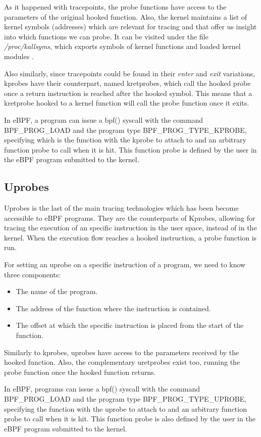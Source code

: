 As it happened with tracepoints, the probe functions have access to the parameters of the original hooked function. Also, the kernel maintains a list of kernel symbols (addresses) which are relevant for tracing and that offer us insight into which functions we can probe. It can be visited under the file \textit{/proc/kallsyms}, which exports symbols of kernel functions and loaded kernel modules \cite{kallsyms_kernel}.

Also similarly, since tracepoints could be found in their \textit{enter} and \textit{exit} variations, kprobes have their counterpart, named kretprobes, which call the hooked probe once a return instruction is reached after the hooked symbol. This means that a kretprobe hooked to a kernel function will call the probe function once it exits.

In eBPF, a program can issue a bpf() syscall with the command BPF\_PROG\_LOAD and the program type BPF\_PROG\_TYPE\_KPROBE, specifying which is the function with the kprobe to attach to and an arbitrary function probe to call when it is hit. This function probe is defined by the user in the eBPF program submitted to the kernel.

\subsection{Uprobes}
Uprobes is the last of the main tracing technologies which has been become accessible to eBPF programs. They are the counterparts of Kprobes, allowing for tracing the execution of an specific instruction in the user space, instead of in the kernel. When the execution flow reaches a hooked instruction, a probe function is run. 

For setting an uprobe on a specific instruction of a program, we need to know three components:
\begin{itemize}
\item The name of the program.
\item The address of the function where the instruction is contained.
\item The offset at which the specific instruction is placed from the start of the function.
\end{itemize}

Similarly to kprobes, uprobes have access to the parameters received by the hooked function. Also, the complementary uretprobes exist too, running the probe function once the hooked function returns.

In eBPF, programs can issue a bpf() syscall with the command BPF\_PROG\_LOAD and the program type BPF\_PROG\_TYPE\_UPROBE, specifying the function with the uprobe to attach to and an arbitrary function probe to call when it is hit. This function probe is also defined by the user in the eBPF program submitted to the kernel.

